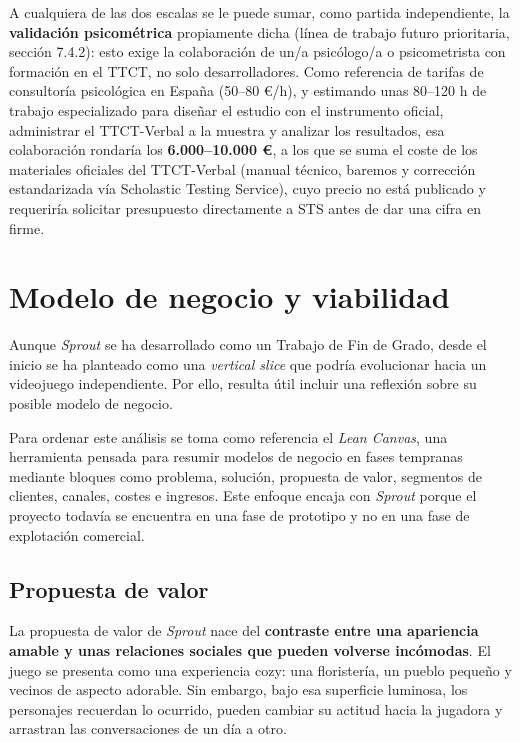 \documentclass[12pt,twoside,titlepage]{report}
\begin{document}
A cualquiera de las dos escalas se le puede sumar, como partida independiente, la \textbf{validación psicométrica} propiamente dicha (línea de trabajo futuro prioritaria, sección 7.4.2): esto exige la colaboración de un/a psicólogo/a o psicometrista con formación en el TTCT, no solo desarrolladores. Como referencia de tarifas de consultoría psicológica en España (50--80 €/h), y estimando unas 80--120 h de trabajo especializado para diseñar el estudio con el instrumento oficial, administrar el TTCT-Verbal a la muestra y analizar los resultados, esa colaboración rondaría los \textbf{6.000--10.000 €}, a los que se suma el coste de los materiales oficiales del TTCT-Verbal (manual técnico, baremos y corrección estandarizada vía Scholastic Testing Service), cuyo precio no está publicado y requeriría solicitar presupuesto directamente a STS antes de dar una cifra en firme.


\section{Modelo de negocio y viabilidad}
Aunque \textit{Sprout} se ha desarrollado como un Trabajo de Fin de Grado, desde el inicio se ha planteado como una \textit{vertical slice} que podría evolucionar hacia un videojuego independiente. Por ello, resulta útil incluir una reflexión sobre su posible modelo de negocio. 

Para ordenar este análisis se toma como referencia el \textit{Lean Canvas}, una herramienta pensada para resumir modelos de negocio en fases tempranas mediante bloques como problema, solución, propuesta de valor, segmentos de clientes, canales, costes e ingresos. Este enfoque encaja con \textit{Sprout} porque el proyecto todavía se encuentra en una fase de prototipo y no en una fase de explotación comercial.

\subsection{Propuesta de valor}

La propuesta de valor de \textit{Sprout} nace del \textbf{contraste entre una apariencia amable y unas relaciones sociales que pueden volverse incómodas}. El juego se presenta como una experiencia cozy: una floristería, un pueblo pequeño y vecinos de aspecto adorable. Sin embargo, bajo esa superficie luminosa, los personajes recuerdan lo ocurrido, pueden cambiar su actitud hacia la jugadora y arrastran las conversaciones de un día a otro.
\end{document}
